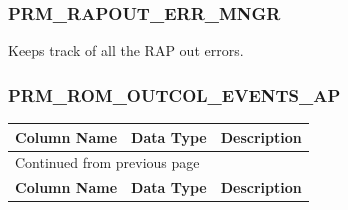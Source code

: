 \documentclass[12pt,twoside]{article}
\begin{document}
\normalsize
\subsubsection{PRM\_RAPOUT\_ERR\_MNGR}
\label{sec:orgheadline82}
Keeps track of all the RAP out errors.
\subsubsection{PRM\_ROM\_OUTCOL\_EVENTS\_AP}
\label{sec:orgheadline83}
\footnotesize
\begin{longtable}{l|l|l}
\hline
\textbf{Column Name} & \textbf{Data Type} & \textbf{Description}\\
\hline
\endfirsthead
\multicolumn{3}{l}{Continued from previous page} \\
\hline

\textbf{Column Name} & \textbf{Data Type} & \textbf{Description} \\


\end{longtable}
\end{document}
